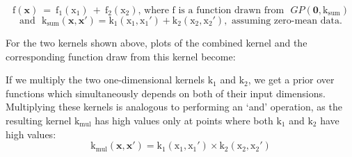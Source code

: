 \documentclass[a4paper,12pt ]{report}
\renewcommand{\GP}{{GP}}
\begin{document}
\begin{equation*} \mathrm{f}(\mathbf{x}) ~=~ \mathrm{f_{1} (x_1)} ~+~ \mathrm{f_{2}(x_2) } \mbox{,~where~}\mathrm{f}\mbox{~is a function drawn from~ }  {\GP}(\bm{0}, \mathrm{k_{sum} }) \end{equation*}
\begin{equation*} \mbox{and ~}  \mathrm{k_{sum} (\mathbf{x}, \mathbf{x'} )} = \mathrm{k_{1}(x_1, x_{1}') + \mathrm{k_{2}(x_2, x_{2}'), \mbox{~assuming zero-mean data.}   }}   \end{equation*}

For the two {\SE} kernels shown above, plots of the combined kernel and the corresponding function draw from this kernel become:

\begin{center}

\end{center}

If we multiply the two one-dimensional kernels $\mathrm{k_1}$ and $\mathrm{k_2}$, we get a prior over functions which simultaneously depends on both of their input dimensions. Multiplying these kernels is analogous to performing an `and' operation, as the resulting kernel $\mathrm{k_{mul}}$ has high values only at points where both $\mathrm{k_1}$ and $\mathrm{k_2}$ have high values:
\begin{equation*} \mathrm{k_{mul} (\mathbf{x}, \mathbf{x'} )} = \mathrm{k_{1}(x_1, x_{1}') \times \mathrm{k_{2}(x_2, x_{2}') }}   \end{equation*}
\end{document}
